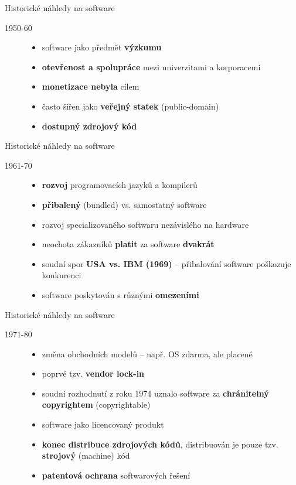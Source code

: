 \documentclass[11pt]{beamer}
\begin{document}
	\begin{frame}{Historické náhledy na software}
		\begin{description}
			\item[1950-60]
			  \begin{itemize}
			  	\item software jako předmět \textbf{výzkumu}
			  	\item \textbf{otevřenost a spolupráce} mezi univerzitami a korporacemi
			  	\item \textbf{monetizace nebyla} cílem
			  	\item často šířen jako \textbf{veřejný statek} (public-domain)
			  	\item \textbf{dostupný zdrojový kód}
			  \end{itemize}
		\end{description}
	\end{frame}

	\begin{frame}{Historické náhledy na software}
	\begin{description}
		\item[1961-70]
		\begin{itemize}
			\item \textbf{rozvoj} programovacích jazyků a kompilerů
			\item \textbf{přibalený} (bundled) vs. samostatný software
			\item rozvoj specializovaného softwaru nezávislého na hardware
			\item neochota zákazníků \textbf{platit} za software \textbf{dvakrát}
			\item soudní spor \textbf{USA vs. IBM (1969)} -- přibalování software poškozuje konkurenci
			\item software poskytován s různými \textbf{omezeními}
		\end{itemize}
	\end{description}
	\end{frame}

	\begin{frame}{Historické náhledy na software}
	\begin{description}
		\item[1971-80]
		\begin{itemize}
			\item změna obchodních modelů -- např. OS zdarma, ale placené 
			\item poprvé tzv. \textbf{vendor lock-in}
			\item soudní rozhodnutí z roku 1974 uznalo software za \textbf{chránitelný copyrightem} (copyrightable)
			\item software jako licencovaný produkt
			\item \textbf{konec distribuce zdrojových kódů}, distribuován je pouze tzv. \textbf{strojový} (machine) kód
			\item \textbf{patentová ochrana} softwarových řešení
		\end{itemize}
	\end{description}
	\end{frame}
\end{document}
